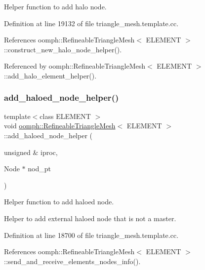 Helper function to add halo node. 



Definition at line 19132 of file triangle\+\_\+mesh.\+template.\+cc.



References oomph\+::\+Refineable\+Triangle\+Mesh$<$ E\+L\+E\+M\+E\+N\+T $>$\+::construct\+\_\+new\+\_\+halo\+\_\+node\+\_\+helper().



Referenced by oomph\+::\+Refineable\+Triangle\+Mesh$<$ E\+L\+E\+M\+E\+N\+T $>$\+::add\+\_\+halo\+\_\+element\+\_\+helper().

\mbox{\label{classoomph_1_1RefineableTriangleMesh_abe41b8b8aa2cc51d507c5e17957faf38}} 
\subsubsection{\texorpdfstring{add\+\_\+haloed\+\_\+node\+\_\+helper()}{add\_haloed\_node\_helper()}}
{\footnotesize\ttfamily template$<$class E\+L\+E\+M\+E\+NT $>$ \\
void \hyperlink{classoomph_1_1RefineableTriangleMesh}{oomph\+::\+Refineable\+Triangle\+Mesh}$<$ E\+L\+E\+M\+E\+NT $>$\+::add\+\_\+haloed\+\_\+node\+\_\+helper (\begin{DoxyParamCaption}\item[{unsigned \&}]{iproc,  }\item[{Node $\ast$}]{nod\+\_\+pt }\end{DoxyParamCaption})\hspace{0.3cm}{\ttfamily [protected]}}



Helper function to add haloed node. 

Helper to add external haloed node that is not a master. 

Definition at line 18700 of file triangle\+\_\+mesh.\+template.\+cc.



References oomph\+::\+Refineable\+Triangle\+Mesh$<$ E\+L\+E\+M\+E\+N\+T $>$\+::send\+\_\+and\+\_\+receive\+\_\+elements\+\_\+nodes\+\_\+info().




